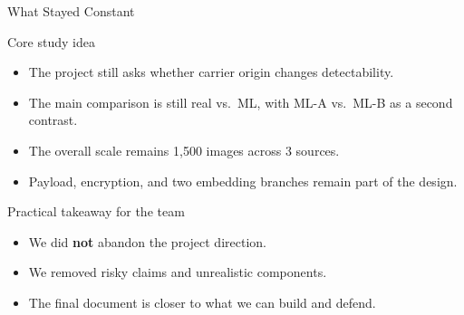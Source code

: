 \documentclass[aspectratio=169,11pt]{beamer}
\begin{document}
\begin{frame}{What Stayed Constant}
\footnotesize
\begin{block}{Core study idea}
\begin{itemize}
\item The project still asks whether carrier origin changes detectability.
\item The main comparison is still real vs.\ ML, with ML-A vs.\ ML-B as a second contrast.
\item The overall scale remains 1,500 images across 3 sources.
\item Payload, encryption, and two embedding branches remain part of the design.
\end{itemize}
\end{block}

\begin{exampleblock}{Practical takeaway for the team}
\begin{itemize}
\item We did \textbf{not} abandon the project direction.
\item We removed risky claims and unrealistic components.
\item The final document is closer to what we can build and defend.
\end{itemize}
\end{exampleblock}
\end{frame}
\end{document}
